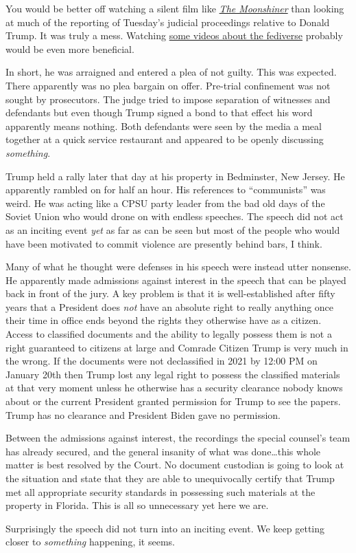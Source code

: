 You would be better off watching a silent film like
\href{https://archive.org/details/moonshiner}{\emph{The Moonshiner}}
than looking at much of the reporting of Tuesday's judicial proceedings
relative to Donald Trump. It was truly a mess. Watching
\href{https://archive.org/details/computersandtechvideos?query=fediverse}{some
videos about the fediverse} probably would be even more beneficial.

In short, he was arraigned and entered a plea of not guilty. This was
expected. There apparently was no plea bargain on offer. Pre-trial
confinement was not sought by prosecutors. The judge tried to impose
separation of witnesses and defendants but even though Trump signed a
bond to that effect his word apparently means nothing. Both defendants
were seen by the media a meal together at a quick service restaurant and
appeared to be openly discussing \emph{something}.

Trump held a rally later that day at his property in Bedminster, New
Jersey. He apparently rambled on for half an hour. His references to
``communists'' was weird. He was acting like a CPSU party leader from
the bad old days of the Soviet Union who would drone on with endless
speeches. The speech did not act as an inciting event \emph{yet} as far
as can be seen but most of the people who would have been motivated to
commit violence are presently behind bars, I think.

Many of what he thought were defenses in his speech were instead utter
nonsense. He apparently made admissions against interest in the speech
that can be played back in front of the jury. A key problem is that it
is well-established after fifty years that a President does \emph{not}
have an absolute right to really anything once their time in office ends
beyond the rights they otherwise have as a citizen. Access to classified
documents and the ability to legally possess them is not a right
guaranteed to citizens at large and Comrade Citizen Trump is very much
in the wrong. If the documents were not declassified in 2021 by 12:00 PM
on January 20th then Trump lost any legal right to possess the
classified materials at that very moment unless he otherwise has a
security clearance nobody knows about or the current President granted
permission for Trump to see the papers. Trump has no clearance and
President Biden gave no permission.

Between the admissions against interest, the recordings the special
counsel's team has already secured, and the general insanity of what was
done\ldots this whole matter is best resolved by the Court. No document
custodian is going to look at the situation and state that they are able
to unequivocally certify that Trump met all appropriate security
standards in possessing such materials at the property in Florida. This
is all so unnecessary yet here we are.

Surprisingly the speech did not turn into an inciting event. We keep
getting closer to \emph{something} happening, it seems.

